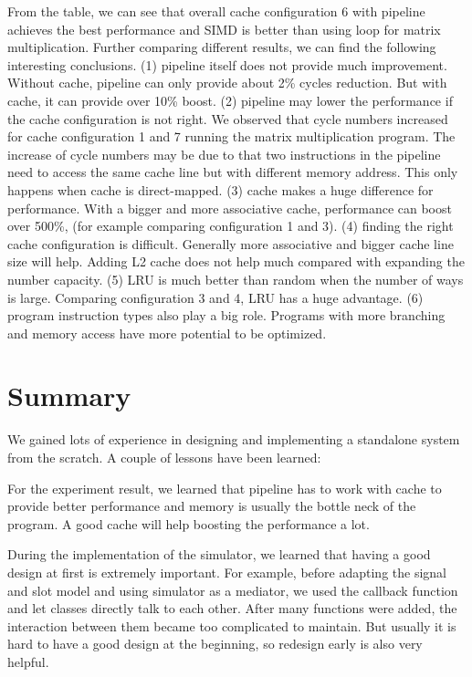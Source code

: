 \documentclass{sig-alternate}
\begin{document}
From the table, we can see that overall cache configuration 6 with pipeline achieves the best performance and SIMD is better than using loop for matrix multiplication. Further comparing different results, we can find the following interesting conclusions. (1) pipeline itself does not provide much improvement. Without cache, pipeline can only provide about 2\% cycles reduction. But with cache, it can provide over 10\% boost. (2) pipeline may lower the performance if the cache configuration is not right. We observed that cycle numbers increased for cache configuration 1 and 7 running the matrix multiplication program. The increase of cycle numbers may be due to that two instructions in the pipeline need to access the same cache line but with different memory address. This only happens when cache is direct-mapped. (3) cache makes a huge difference for performance. With a bigger and more associative cache, performance can boost over 500\%, (for example comparing configuration 1 and 3). (4) finding the right cache configuration is difficult. Generally more associative and bigger cache line size will help. Adding L2 cache does not help much compared with expanding the number capacity. (5) LRU is much better than random when the number of ways is large. Comparing configuration 3 and 4, LRU has a huge advantage. (6) program instruction types also play a big role. Programs with more branching and memory access have more potential to be optimized. 

\section{Summary}
We gained lots of experience in designing and implementing a standalone system from the scratch. A couple of lessons have been learned:

For the experiment result, we learned that pipeline has to work with cache to provide better performance and memory is usually the bottle neck of the program. A good cache will help boosting the performance a lot. 

During the implementation of the simulator, we learned that having a good design at first is extremely important. For example, before adapting the signal and slot model and using simulator as a mediator, we used the callback function and let classes directly talk to each other. After many functions were added, the interaction between them became too complicated to maintain. But usually it is hard to have a good design at the beginning, so redesign early is also very helpful. 
\end{document}
